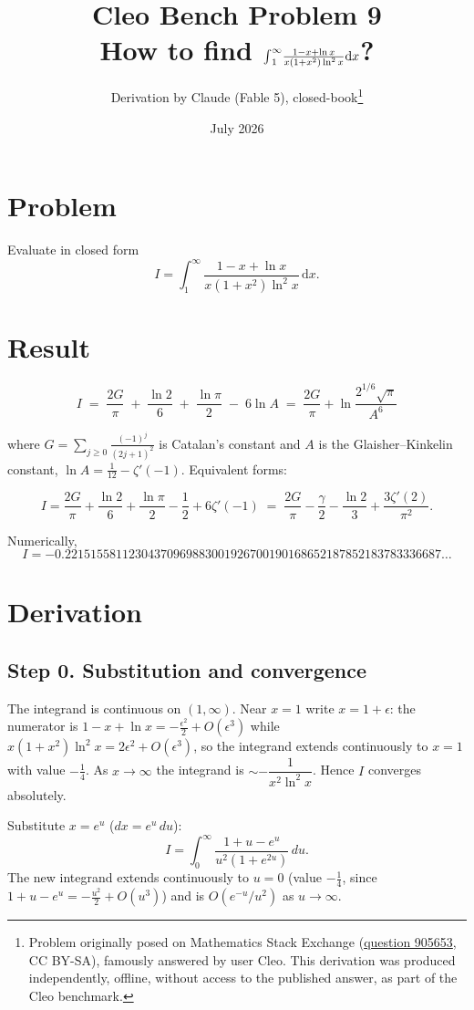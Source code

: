 \documentclass[11pt]{article}
\title{Cleo Bench Problem 9\\[1ex]\large How to find ${\large\int}_1^\infty\frac{1-x+\ln x}{x \left(1+x^2\right) \ln^2 x} \mathrm dx$?}
\author{Derivation by Claude (Fable 5), closed-book\thanks{Problem originally
posed on Mathematics Stack Exchange
(\href{https://math.stackexchange.com/q/905653}{question 905653}, CC BY-SA),
famously answered by user Cleo. This derivation was produced independently,
offline, without access to the published answer, as part of the Cleo benchmark.}}
\date{July 2026}
\theoremstyle{remark}
\begin{document}
\maketitle

\section*{Problem}

Evaluate in closed form
$$
I=\int_1^\infty\frac{1-x+\ln x}{x\left(1+x^2\right)\ln^2 x}\,\mathrm dx .
$$

\section*{Result}

$$
\boxed{\;I \;=\; \frac{2G}{\pi}\;+\;\frac{\ln 2}{6}\;+\;\frac{\ln \pi}{2}\;-\;6\ln A\;=\;\frac{2G}{\pi}+\ln\frac{2^{1/6}\sqrt{\pi}}{A^{6}}\;}
$$

where $G=\sum_{j\ge 0}\frac{(-1)^j}{(2j+1)^2}$ is Catalan's constant and $A$ is the Glaisher--Kinkelin constant, $\ln A=\frac1{12}-\zeta'(-1)$. Equivalent forms:

$$
I=\frac{2G}{\pi}+\frac{\ln 2}{6}+\frac{\ln\pi}{2}-\frac12+6\zeta'(-1)
\;=\;\frac{2G}{\pi}-\frac{\gamma}{2}-\frac{\ln 2}{3}+\frac{3\zeta'(2)}{\pi^{2}} .
$$

Numerically,
$$
I=-0.22151558112304370969883001926700190168652187852183783336687\ldots
$$

\section*{Derivation}

\subsection*{Step 0. Substitution and convergence}

The integrand is continuous on $(1,\infty)$. Near $x=1$ write $x=1+\epsilon$: the numerator is
$1-x+\ln x=-\tfrac{\epsilon^2}{2}+O(\epsilon^3)$ while $x(1+x^2)\ln^2x=2\epsilon^2+O(\epsilon^3)$, so the integrand extends continuously to $x=1$ with value $-\tfrac14$. As $x\to\infty$ the integrand is $\sim -\dfrac{1}{x^{2}\ln^{2}x}$. Hence $I$ converges absolutely.

Substitute $x=e^u$ ($dx=e^u\,du$):
\begin{equation*}
I=\int_0^\infty\frac{1+u-e^{u}}{u^{2}\left(1+e^{2u}\right)}\,du .
\tag{1}
\end{equation*}
The new integrand extends continuously to $u=0$ (value $-\tfrac14$, since $1+u-e^u=-\tfrac{u^2}2+O(u^3)$) and is $O(e^{-u}/u^{2})$ as $u\to\infty$.
\end{document}
